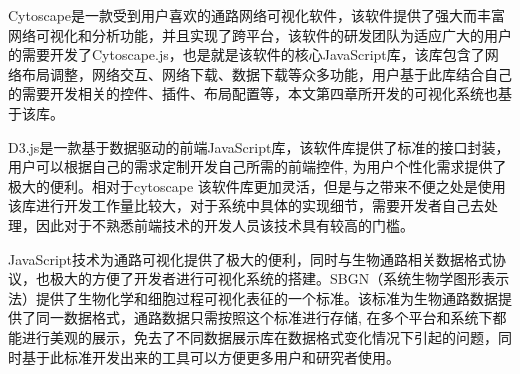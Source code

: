 Cytoscape\cite{franz2015cytoscape}是一款受到用户喜欢的通路网络可视化软件，该软件提供了强大而丰富网络可视化和分析功能，并且实现了跨平台，该软件的研发团队为适应广大的用户的需要开发了Cytoscape.js，也是就是该软件的核心JavaScript库，该库包含了网络布局调整，网络交互、网络下载、数据下载等众多功能，用户基于此库结合自己的需要开发相关的控件、插件、布局配置等，本文第四章所开发的可视化系统也基于该库。


D3.js\cite{bostock2012d3}是一款基于数据驱动的前端JavaScript库，该软件库提供了标准的接口封装，用户可以根据自己的需求定制开发自己所需的前端控件, 为用户个性化需求提供了极大的便利。相对于cytoscape 该软件库更加灵活，但是与之带来不便之处是使用该库进行开发工作量比较大，对于系统中具体的实现细节，需要开发者自己去处理，因此对于不熟悉前端技术的开发人员该技术具有较高的门槛。

JavaScript技术为通路可视化提供了极大的便利，同时与生物通路相关数据格式协议，也极大的方便了开发者进行可视化系统的搭建。SBGN\cite{le2009systems}（系统生物学图形表示法）提供了生物化学和细胞过程可视化表征的一个标准。该标准为生物通路数据提供了同一数据格式，通路数据只需按照这个标准进行存储, 在多个平台和系统下都能进行美观的展示，免去了不同数据展示库在数据格式变化情况下引起的问题，同时基于此标准开发出来的工具可以方便更多用户和研究者使用。

